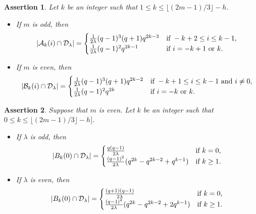 \documentclass[journal,onecolumn]{IEEEtran}
\newtheorem{assertion}{Assertion}
\begin{document}
\begin{assertion}\label{as2}
  Let $k$ be an integer such that  $1\leq  k\leq \lfloor (2m-1)/3\rfloor-h$. 
    \begin{itemize}
        \item 
If $m$ is odd, then 
    \begin{equation}\label{as3ee0}
        |\mathcal{A}_{k}(i)\cap \mathcal{D}_{\lambda}|=\begin{cases}
         \frac{1}{2\lambda}(q-1)^3(q+1)q^{2k-3}  &\hbox{if } -k+2\leq i \leq  k-1,\\
         \frac{1}{2\lambda}(q-1)^2q^{2k-1} &\hbox{if }i=-k+1 \hbox{ or }k.
     \end{cases}
    \end{equation}     
\item If $m$ is even, then 
    \begin{equation}\label{as3ee05}
        |\mathcal{B}_{k}(i)\cap \mathcal{D}_{\lambda}|=\begin{cases}
         \frac{1}{2\lambda}(q-1)^3(q+1) q^{2k-2}  &\hbox{if } -k+1 \leq i \leq k-1\hbox{ and }i\neq 0,\\
         \frac{1}{2\lambda}(q-1)^2q^{2k} &\hbox{if }i=-k \hbox{ or }k.
     \end{cases}
    \end{equation}  
     \end{itemize}
 \end{assertion}


\begin{assertion}\label{as3}
Suppose that $m$ is even.    Let  $k$ be  an integer such that   $0\leq k\leq \lfloor (2m-1)/3\rfloor-h]$. 
 \begin{itemize}
     \item 
 If 
 $\lambda$ is odd, then 
\begin{equation}\notag
    |B_k(0)\cap \mathcal{D}_{\lambda}| =  \begin{cases}
   \frac{q(q-1)}{2\lambda} &\hbox{if $k=0$,}\\
\frac{(q-1)^2}{2\lambda}(q^{2k}-q^{2k-2}+q^{k-1})
&\hbox{if $k\geq 1$.}
\end{cases}
 \end{equation} 
\item If $\lambda$ is even, then 
 \begin{equation}\notag
    |B_k(0)\cap \mathcal{D}_{\lambda}| =  \begin{cases}
   \frac{(q+1)(q-1)}{2\lambda} &\hbox{if $k=0$,}\\
\frac{(q-1)^2}{2\lambda}(q^{2k}-q^{2k-2}+2q^{k-1})
&\hbox{if $k\geq 1$.}
\end{cases}
 \end{equation} 
 \end{itemize}
\end{assertion}
\end{document}
